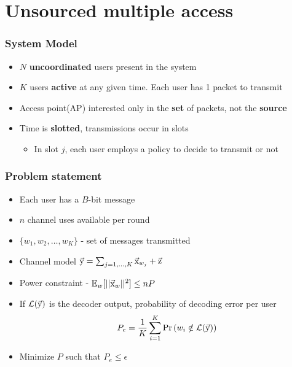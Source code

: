 \documentclass[10pt]{beamer}
\def\mac_figpath{../Figures/MAC}
\begin{document}
%

\section{Unsourced multiple access}
\begin{frame}
\frametitle{System Model}

  \begin{itemize}
  \item $N$ \textbf{uncoordinated} users present in the system
  \item $K$ users \textbf{active} at any given time. Each user has 1 packet to transmit
  \item Access point(AP) interested only in the \textbf{set} of packets, not the \textbf{source}
  \item Time is \textbf{slotted}, transmissions occur in slots
    \begin{itemize}
	   \item In slot $j$, each user employs a policy to decide to transmit or not
  \end{itemize}

  \end{itemize}
\pause
  \begin{center}
  
  \end{center}
\end{frame}

\begin{frame}\frametitle{Problem statement}
  \begin{itemize}
  \item Each user has a $B$-bit message
  \item $n$ channel uses available per round
  \pause
  \item $\{w_1,w_2,\ldots,w_K\}$ - set of messages transmitted
  \item Channel model $\vec{\mathrm{y}}=\sum_{j=1,\ldots,K}\vec{\mathrm{x}}_{w_j}+\vec{\mathrm{z}}$
  \item Power constraint -$~\mathbb{E}_w[||\vec{\mathrm{x}}_w||^2]\leq nP$
  \item If $\mathcal{L}(\vec{\mathrm{y}}) $ is the decoder output, probability of decoding error per user
  \[
P_e=\frac{1}{K}\sum_{i=1}^{K} \Pr\left( w_i \notin \mathcal{L}(\vec{\mathrm{y}}) \right)  
  \]
  \pause
  \item Minimize $P$ such that $P_e\leq \epsilon$
  \end{itemize}
\end{frame}
\end{document}
